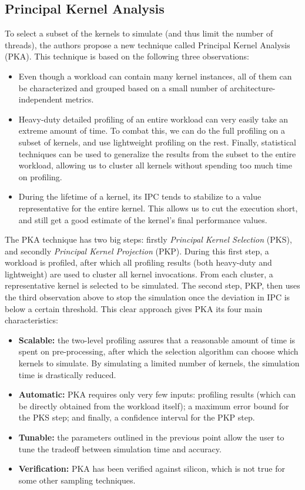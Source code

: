 \subsection{Principal Kernel Analysis}\label{subsec:principle-kernel-analysis}
To select a subset of the kernels to simulate (and thus limit the number of threads), the authors propose a new technique called Principal Kernel Analysis (PKA).
This technique is based on the following three observations:
\begin{itemize}
    \item Even though a workload can contain many kernel instances, all of them can be characterized and grouped based on a small number of architecture-independent metrics.
    \item Heavy-duty detailed profiling of an entire workload can very easily take an extreme amount of time.
    To combat this, we can do the full profiling on a subset of kernels, and use lightweight profiling on the rest.
    Finally, statistical techniques can be used to generalize the results from the subset to the entire workload, allowing us to cluster all kernels without spending too much time on profiling.
    \item During the lifetime of a kernel, its IPC tends to stabilize to a value representative for the entire kernel.
    This allows us to cut the execution short, and still get a good estimate of the kernel's final performance values.
\end{itemize}

The PKA technique has two big steps: firstly \textit{Principal Kernel Selection} (PKS), and secondly \textit{Principal Kernel Projection} (PKP).
During this first step, a workload is profiled, after which all profiling results (both heavy-duty and lightweight) are used to cluster all kernel invocations.
From each cluster, a representative kernel is selected to be simulated.
The second step, PKP, then uses the third observation above to stop the simulation once the deviation in IPC is below a certain threshold.
This clear approach gives PKA its four main characteristics:
\begin{itemize}
    \item \textbf{Scalable:} the two-level profiling assures that a reasonable amount of time is spent on pre-processing, after which the selection algorithm can choose which kernels to simulate.
    By simulating a limited number of kernels, the simulation time is drastically reduced.
    \item \textbf{Automatic:} PKA requires only very few inputs: profiling results (which can be directly obtained from the workload itself); a maximum error bound for the PKS step; and finally, a confidence interval for the PKP step.
    \item \textbf{Tunable:} the parameters outlined in the previous point allow the user to tune the tradeoff between simulation time and accuracy.
    \item \textbf{Verification:} PKA has been verified against silicon, which is not true for some other sampling techniques.
\end{itemize}

